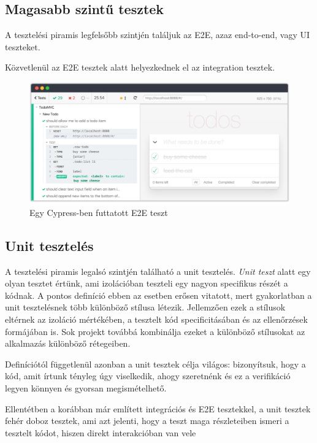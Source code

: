 \subsection{Magasabb szintű tesztek}

A tesztelési piramis legfelsőbb szintjén találjuk az E2E, azaz end-to-end, vagy UI teszteket.

Közvetlenül az E2E tesztek alatt helyezkednek el az integration tesztek.

\begin{figure}[H]
    \centering
    \includegraphics[width=1\textwidth]{images/cypress.png}
    \caption{Egy Cypress-ben futtatott E2E teszt}
    \label{fig:cypress-example}
\end{figure}

\subsection{Unit tesztelés}

A tesztelési piramis legalsó szintjén található a unit tesztelés. \textit{Unit teszt} alatt egy olyan tesztet értünk, ami izolációban teszteli egy nagyon specifikus részét a kódnak. A pontos definíció ebben az esetben erősen vitatott, mert gyakorlatban a unit tesztelésnek több különböző stílusa létezik. Jellemzően ezek a stílusok eltérnek az izoláció mértékében, a tesztelt kód specificitásában és az ellenőrzések formájában is. Sok projekt továbbá kombinálja ezeket a különböző stílusokat az alkalmazás különböző rétegeiben.

Definíciótól függetlenül azonban a unit tesztek célja világos: bizonyítsuk, hogy a kód, amit írtunk tényleg úgy viselkedik, ahogy szeretnénk és ez a verifikáció legyen könnyen és gyorsan megismételhető.

Ellentétben a korábban már említett integrációs és E2E tesztekkel, a unit tesztek fehér doboz tesztek, ami azt jelenti, hogy a teszt maga részleteiben ismeri a tesztelt kódot, hiszen direkt interakcióban van vele


